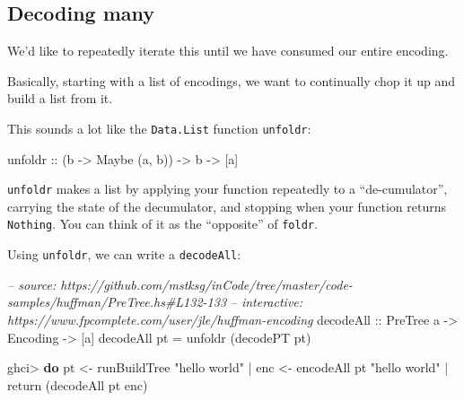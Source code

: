 \documentclass[]{article}
\newenvironment{Shaded}{}{}
\newcommand{\KeywordTok}[1]{\textcolor[rgb]{0.00,0.44,0.13}{\textbf{{#1}}}}
\newcommand{\DataTypeTok}[1]{\textcolor[rgb]{0.56,0.13,0.00}{{#1}}}
\newcommand{\StringTok}[1]{\textcolor[rgb]{0.25,0.44,0.63}{{#1}}}
\newcommand{\CommentTok}[1]{\textcolor[rgb]{0.38,0.63,0.69}{\textit{{#1}}}}
\newcommand{\OtherTok}[1]{\textcolor[rgb]{0.00,0.44,0.13}{{#1}}}
\newcommand{\FunctionTok}[1]{\textcolor[rgb]{0.02,0.16,0.49}{{#1}}}
\newcommand{\NormalTok}[1]{{#1}}
\begin{document}
\subsection{Decoding many}\label{decoding-many}

We'd like to repeatedly iterate this until we have consumed our entire
encoding.

Basically, starting with a list of encodings, we want to continually
chop it up and build a list from it.

This sounds a lot like the \texttt{Data.List} function \texttt{unfoldr}:

\begin{Shaded}
\begin{Highlighting}[]
\OtherTok{unfoldr ::} \NormalTok{(b }\OtherTok{->} \DataTypeTok{Maybe} \NormalTok{(a, b)) }\OtherTok{->} \NormalTok{b }\OtherTok{->} \NormalTok{[a]}
\end{Highlighting}
\end{Shaded}

\texttt{unfoldr} makes a list by applying your function repeatedly to a
``de-cumulator'', carrying the state of the decumulator, and stopping
when your function returns \texttt{Nothing}. You can think of it as the
``opposite'' of \texttt{foldr}.

Using \texttt{unfoldr}, we can write a \texttt{decodeAll}:

\begin{Shaded}
\begin{Highlighting}[]
\CommentTok{-- source: https://github.com/mstksg/inCode/tree/master/code-samples/huffman/PreTree.hs#L132-133}
\CommentTok{-- interactive: https://www.fpcomplete.com/user/jle/huffman-encoding}
\OtherTok{decodeAll ::} \DataTypeTok{PreTree} \NormalTok{a }\OtherTok{->} \DataTypeTok{Encoding} \OtherTok{->} \NormalTok{[a]}
\NormalTok{decodeAll pt }\FunctionTok{=} \NormalTok{unfoldr (decodePT pt)}
\end{Highlighting}
\end{Shaded}

\begin{Shaded}
\begin{Highlighting}[]
\NormalTok{ghci}\FunctionTok{>} \KeywordTok{do} \NormalTok{pt  }\OtherTok{<-} \NormalTok{runBuildTree }\StringTok{"hello world"}
 \FunctionTok{|}    \NormalTok{enc }\OtherTok{<-} \NormalTok{encodeAll pt }\StringTok{"hello world"}
 \FunctionTok{|}    \NormalTok{return (decodeAll pt enc)}
\end{Highlighting}
\end{Shaded}
\end{document}
